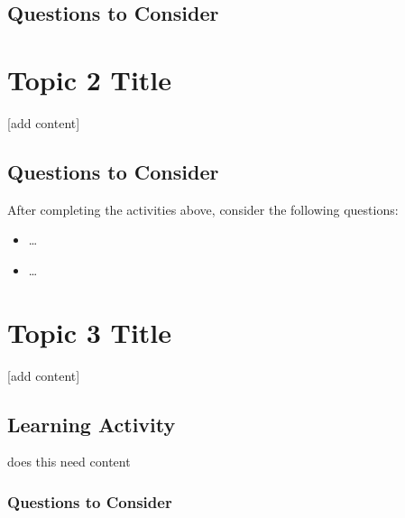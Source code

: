 \documentclass[
]{book}
\providecommand{\tightlist}{%
  \setlength{\itemsep}{0pt}\setlength{\parskip}{0pt}}
\begin{document}
\hypertarget{questions-to-consider-1}{%
\subsection*{Questions to Consider}\label{questions-to-consider-1}}

\hypertarget{topic-2-title}{%
\section{Topic 2 Title}\label{topic-2-title}}

{[}add content{]}

\hypertarget{questions-to-consider-2}{%
\subsection*{Questions to Consider}\label{questions-to-consider-2}}

After completing the activities above, consider the following questions:

\begin{itemize}
\tightlist
\item
  \ldots{}\\
\item
  \ldots{}
\end{itemize}

\hypertarget{topic-3-title}{%
\section{Topic 3 Title}\label{topic-3-title}}

{[}add content{]}

\hypertarget{learning-activity-5}{%
\subsection*{Learning Activity}\label{learning-activity-5}}

\begin{reflect}
does this need content
\end{reflect}

\hypertarget{questions-to-consider-3}{%
\subsubsection*{Questions to Consider}\label{questions-to-consider-3}}
\end{document}
